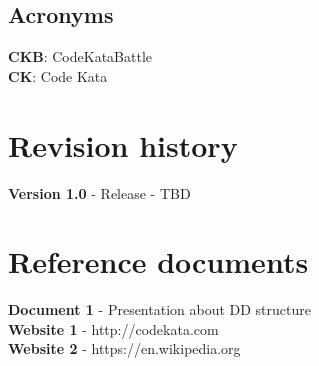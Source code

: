 \documentclass[12pt, a4paper]{report}
\begin{document}
    \subsection{Acronyms}
    \textbf{CKB}: CodeKataBattle 
    \\
    \textbf{CK}: Code Kata
    

    \section{Revision history}
    \textbf{Version 1.0} - Release - TBD


    \section{Reference documents}
    \textbf{Document 1} - Presentation about DD structure
    \\
    \textbf{Website 1} - http://codekata.com
    \\
    \textbf{Website 2} - https://en.wikipedia.org
\end{document}
